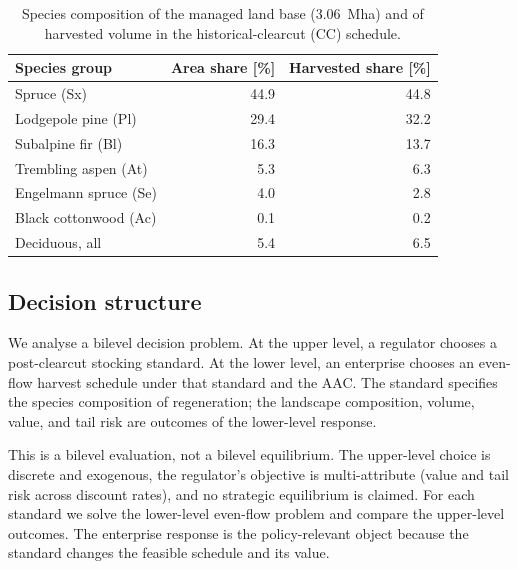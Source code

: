 \begin{table}[h]
    \centering
    \caption{Species composition of the managed land base (\SI{3.06}{\mega\hectare}) and of
    harvested volume in the historical-clearcut (CC) schedule.}
    \label{tab:meth_studyregion_spec}
    \begin{tabular}{lrr}
        \toprule
        Species group & Area share [\%] & Harvested share [\%] \\
        \midrule
        Spruce (Sx)                        & 44.9 & 44.8 \\
        Lodgepole pine (Pl)                & 29.4 & 32.2 \\
        Subalpine fir (Bl)                 & 16.3 & 13.7 \\
        Trembling aspen (At)               & 5.3  & 6.3  \\
        Engelmann spruce (Se)              & 4.0  & 2.8  \\
        Black cottonwood (Ac)              & 0.1  & 0.2  \\
        \midrule
        Deciduous, all                    & 5.4  & 6.5  \\
        \bottomrule
    \end{tabular}
\end{table}

\subsection{Decision structure}

We analyse a bilevel decision problem. At the upper level, a regulator chooses a post-clearcut
stocking standard. At the lower level, an enterprise chooses an even-flow harvest schedule under that
standard and the AAC. The standard specifies the species composition of regeneration; the landscape
composition, volume, value, and tail risk are outcomes of the lower-level response.

This is a bilevel evaluation, not a bilevel equilibrium. The upper-level choice is discrete and
exogenous, the regulator's objective is multi-attribute (value and tail risk across discount rates),
and no strategic equilibrium is claimed. For each standard we solve the lower-level even-flow problem
and compare the upper-level outcomes. The enterprise response is the policy-relevant object because
the standard changes the feasible schedule and its value.


